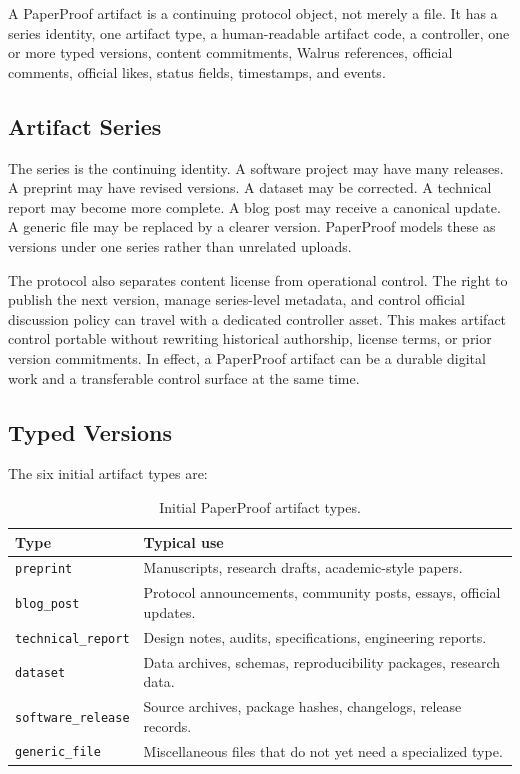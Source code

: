 \documentclass[11pt]{article}
\newcommand{\code}[1]{\texttt{#1}}
\begin{document}
A PaperProof artifact is a continuing protocol object, not merely a file. It has
a series identity, one artifact type, a human-readable artifact code, a
controller, one or more typed versions, content commitments, Walrus references,
official comments, official likes, status fields, timestamps, and events.

\subsection{Artifact Series}

The series is the continuing identity. A software project may have many releases.
A preprint may have revised versions. A dataset may be corrected. A technical
report may become more complete. A blog post may receive a canonical update. A
generic file may be replaced by a clearer version. PaperProof models these as
versions under one series rather than unrelated uploads.

The protocol also separates content license from operational control. The right
to publish the next version, manage series-level metadata, and control official
discussion policy can travel with a dedicated controller asset. This makes
artifact control portable without rewriting historical authorship, license
terms, or prior version commitments. In effect, a PaperProof artifact can be a
durable digital work and a transferable control surface at the same time.

\subsection{Typed Versions}

The six initial artifact types are:

\begin{table}[htbp]
\centering
\caption{Initial PaperProof artifact types.}
\begin{tabularx}{\textwidth}{p{}X}
\toprule
\textbf{Type} & \textbf{Typical use} \\
\midrule
\code{preprint} & Manuscripts, research drafts, academic-style papers. \\
\code{blog\_post} & Protocol announcements, community posts, essays, official updates. \\
\code{technical\_report} & Design notes, audits, specifications, engineering reports. \\
\code{dataset} & Data archives, schemas, reproducibility packages, research data. \\
\code{software\_release} & Source archives, package hashes, changelogs, release records. \\
\code{generic\_file} & Miscellaneous files that do not yet need a specialized type. \\
\bottomrule
\end{tabularx}
\end{table}
\end{document}
